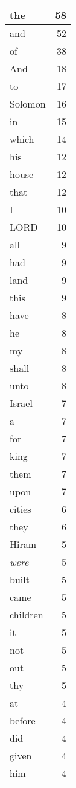 \begin{center}
\begin{longtable}{l|r}
\hline \hline
\endlastfoot
the & 58 \\ \hline
and & 52 \\ \hline
of & 38 \\ \hline
And & 18 \\ \hline
to & 17 \\ \hline
Solomon & 16 \\ \hline
in & 15 \\ \hline
which & 14 \\ \hline
his & 12 \\ \hline
house & 12 \\ \hline
that & 12 \\ \hline
I & 10 \\ \hline
LORD & 10 \\ \hline
all & 9 \\ \hline
had & 9 \\ \hline
land & 9 \\ \hline
this & 9 \\ \hline
have & 8 \\ \hline
he & 8 \\ \hline
my & 8 \\ \hline
shall & 8 \\ \hline
unto & 8 \\ \hline
Israel & 7 \\ \hline
a & 7 \\ \hline
for & 7 \\ \hline
king & 7 \\ \hline
them & 7 \\ \hline
upon & 7 \\ \hline
cities & 6 \\ \hline
they & 6 \\ \hline
Hiram & 5 \\ \hline
\emph{were} & 5 \\ \hline
built & 5 \\ \hline
came & 5 \\ \hline
children & 5 \\ \hline
it & 5 \\ \hline
not & 5 \\ \hline
out & 5 \\ \hline
thy & 5 \\ \hline
at & 4 \\ \hline
before & 4 \\ \hline
did & 4 \\ \hline
given & 4 \\ \hline
him & 4 \\ \hline

\end{longtable}
\end{center}
